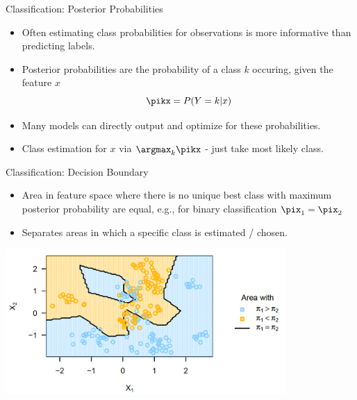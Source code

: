 \begin{frame}{Classification: Posterior Probabilities}

\begin{itemize}
\item
  Often estimating class probabilities for observations is more
  informative than predicting labels.
\item
  Posterior probabilities are the probability of a class \(k\) occuring,
  given the feature \(x\) \[
  \pikx = P(Y = k | x)
  \]
\item
  Many models can directly output and optimize for these probabilities.
\item
  Class estimation for \(x\) via \(\argmax_{k} \pikx\) - just take most
  likely class.
\end{itemize}

\end{frame}

\begin{frame}{Classification: Decision Boundary}

\begin{itemize}
\item
  Area in feature space where there is no unique best class with maximum
  posterior probability are equal, e.g., for binary classification
  \(\pix_1 = \pix_2\)
\item
  Separates areas in which a specific class is estimated / chosen.
\end{itemize}

\scriptsize
\begin{center}
\includegraphics[width=0.8\textwidth]{plots/decision-boundary.png}
\end{center}

\normalsize 

\end{frame}



